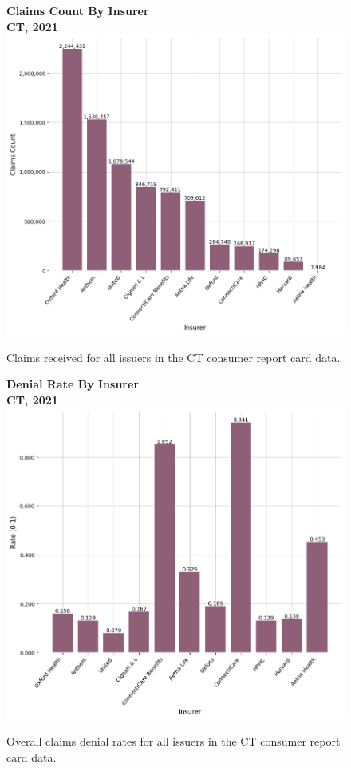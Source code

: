 \documentclass[12pt, a4paper,twoside,parskip=full]{report}
\theoremstyle{plain} %
\theoremstyle{definition} %
\theoremstyle{remark} %
\numberwithin{equation}{chapter}
\begin{document}
		\begin{figure}[h!]
			\centering
			\textbf{Claims Count By Insurer}\\
			\textbf{CT, 2021}\\
			\includegraphics[width=\columnwidth]{images/ct_claims/claims_by_insurer.png}
			\caption{Claims received for all issuers in the CT consumer report card data.}
			\label{ctinsurerclaims}
		\end{figure}
		
		\clearpage
		
		
		\begin{figure}[h!]
			\centering
			\textbf{Denial Rate By Insurer}\\
			\textbf{CT, 2021}\\
			\includegraphics[width=\columnwidth]{images/ct_claims/denial_rate_by_insurer.png}
			\caption{Overall claims denial rates for all issuers in the CT consumer report card data.}
			\label{ctinsurerdenialrates}
		\end{figure}
		
\end{document}
